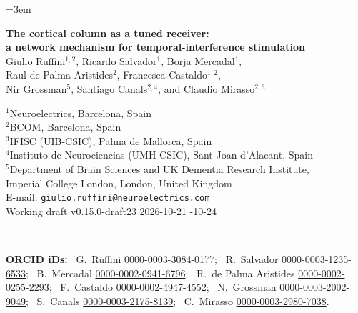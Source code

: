 \documentclass[11pt,a4paper]{article}
\newif\ifjne
\newcommand{\paperver}{0.15.0-draft23} %
\providecommand{\DIFaddtex}[1]{{\protect\color{blue} \sf #1}} %
\providecommand{\DIFdeltex}[1]{{\protect\color{red} \scriptsize #1}} %
\providecommand{\DIFaddbegin}{} %
\providecommand{\DIFaddend}{} %
\providecommand{\DIFdelbegin}{} %
\providecommand{\DIFdelend}{} %
\providecommand{\DIFadd}[1]{\texorpdfstring{\DIFaddtex{#1}}{#1}} %
\providecommand{\DIFdel}[1]{\texorpdfstring{\DIFdeltex{#1}}{}} %
\begin{document}
\emergencystretch=3em
\par

\ifjne
\begin{center}
{\LARGE\bfseries The cortical column as a tuned receiver:\\[4pt]
a network mechanism for temporal-interference stimulation}\\[16pt]
{\large Giulio Ruffini$^{1,2}$, Ricardo Salvador$^{1}$, Borja Mercadal$^{1}$,\\[2pt]
Raul de Palma Aristides$^{2}$, Francesca Castaldo$^{1,2}$,\\[2pt]
Nir Grossman$^{5}$, Santiago Canals$^{2,4}$, and Claudio Mirasso$^{2,3}$}\\[12pt]
\begin{minipage}{0.86\textwidth}\centering\small
$^{1}$Neuroelectrics, Barcelona, Spain\\
$^{2}$BCOM, Barcelona, Spain\\
$^{3}$IFISC (UIB-CSIC), Palma de Mallorca, Spain\\
$^{4}$Instituto de Neurociencias (UMH-CSIC), Sant Joan d'Alacant, Spain\\
$^{5}$Department of Brain Sciences and UK Dementia Research Institute,\\
Imperial College London, London, United Kingdom\\[6pt]
E-mail: \texttt{giulio.ruffini@neuroelectrics.com}\\[4pt]
Working draft v\paperver\quad \DIFdelbegin \DIFdel{2026-10-21
}\DIFdelend \DIFaddbegin \DIFadd{2026-10-24
}\DIFaddend \end{minipage}\\[8pt]
\begin{minipage}{0.86\textwidth}\centering\footnotesize\color{negray}
\textbf{ORCID iDs:}\ %
G.~Ruffini \href{https://orcid.org/0000-0003-3084-0177}{0000-0003-3084-0177};\ %
R.~Salvador \href{https://orcid.org/0000-0003-1235-6533}{0000-0003-1235-6533};\ %
B.~Mercadal \href{https://orcid.org/0000-0002-0941-6796}{0000-0002-0941-6796};\ %
R.~de Palma Aristides \href{https://orcid.org/0000-0002-0255-2293}{0000-0002-0255-2293};\ %
F.~Castaldo \href{https://orcid.org/0000-0002-4947-4552}{0000-0002-4947-4552};\ %
N.~Grossman \href{https://orcid.org/0000-0003-2002-9049}{0000-0003-2002-9049};\ %
S.~Canals \href{https://orcid.org/0000-0003-2175-8139}{0000-0003-2175-8139};\ %
C.~Mirasso \href{https://orcid.org/0000-0003-2980-7038}{0000-0003-2980-7038}.
\end{minipage}
\end{center}
\end{document}
